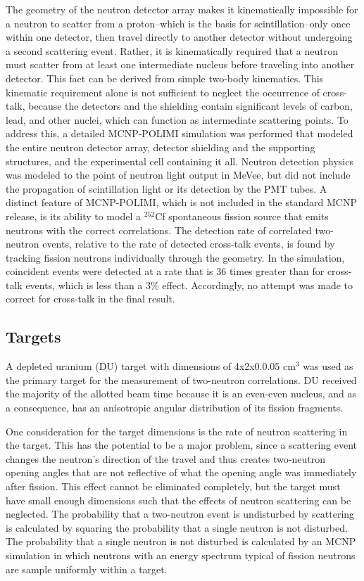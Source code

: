 The geometry of the neutron detector array makes it kinematically impossible for a neutron to scatter from a proton--which is the basis for scintillation--only once within one detector, then travel directly to another detector without undergoing a second scattering event. Rather, it is kinematically required that a neutron must scatter from at least one intermediate nucleus before traveling into another detector. This fact can be derived from simple two-body kinematics. This kinematic requirement alone is not sufficient to neglect the occurrence of cross-talk, because the detectors and the shielding contain significant levels of carbon, lead, and other nuclei, which can function as intermediate scattering points. To address this, a detailed MCNP-POLIMI simulation was performed that modeled the entire neutron detector array, detector shielding and the supporting structures, and the experimental cell containing it all. Neutron detection physics was modeled to the point of neutron light output in MeVee, but did not include the propagation of scintillation light or its detection by the PMT tubes. A distinct feature of MCNP-POLIMI, which is not included in the standard MCNP release, is its ability to model a $^{252}$Cf spontaneous fission source that emits neutrons with the correct correlations.
The detection rate of correlated two-neutron events, relative to the rate of detected cross-talk events, is found by tracking fission neutrons individually through the geometry. In the simulation, coincident events were detected at a rate that is 36 times greater than for cross-talk events, which is less than a 3\% effect. Accordingly, no attempt was made to correct for cross-talk in the final result.


\subsection{Targets}
A depleted uranium (DU) target with dimensions of 4x2x0.0.05 $\text{cm}^3$ was used as the primary target for the measurement of two-neutron correlations. DU received the majority of the allotted beam time because it is an even-even nucleus, and as a consequence, has an anisotropic angular distribution of its fission fragments.

One consideration for the target dimensions is the rate of neutron scattering in the target. This has the potential to be a major problem, since a scattering event changes the neutron's direction of the travel and thus creates two-neutron opening angles that are not reflective of what the opening angle was immediately after fission. This effect cannot be eliminated completely, but the target must have small enough dimensions such that the effects of neutron scattering can be neglected. The probability that a two-neutron event is undisturbed by scattering is calculated by squaring the probability that a single neutron is not disturbed. The probability that a single neutron is not disturbed is calculated by an MCNP simulation in which neutrons with an energy spectrum typical of fission neutrons are sample uniformly within a target.


